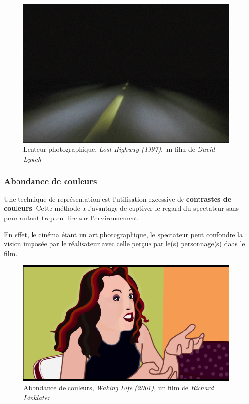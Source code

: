 \documentclass[../main.tex]{subfile}
\begin{document}
\begin{figure}
    \centering
    \includegraphics[width=\linewidth]{images/long}
    \caption{Lenteur photographique, \textit{Lost Highway (1997)}, un film de
             \textit{David Lynch}}
    \label{fig:images_long}
\end{figure}

\subsubsection{Abondance de couleurs}

Une technique de représentation est l'utilisation excessive de
\textbf{contrastes de couleurs}. Cette méthode a l'avantage de captiver le
regard du spectateur sans pour autant trop en dire sur l'environnement.

En effet, le cinéma étant un art photographique, le spectateur peut confondre
la vision imposée par le réalisateur avec celle perçue par le(s) personnage(s)
dans le film.

\begin{figure}
    \centering
    \includegraphics[width=\linewidth]{images/colors}
    \caption{Abondance de couleurs, \textit{Waking Life (2001)}, un film de
             \textit{Richard Linklater}}
    \label{fig:images_colors}
\end{figure}
\end{document}
